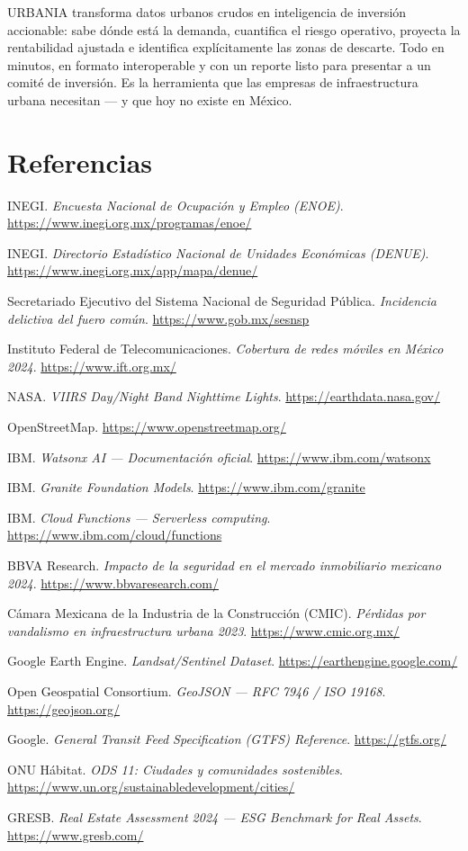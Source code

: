 \documentclass[12pt,a4paper]{article}
\begin{document}
URBANIA transforma datos urbanos crudos en inteligencia de inversión accionable: sabe dónde está la demanda, cuantifica el riesgo operativo, proyecta la rentabilidad ajustada e identifica explícitamente las zonas de descarte. Todo en minutos, en formato interoperable y con un reporte listo para presentar a un comité de inversión. Es la herramienta que las empresas de infraestructura urbana necesitan — y que hoy no existe en México.


\newpage
\section{Referencias}

\begin{enumerate}[label={[\arabic*]}, leftmargin=1.5cm]
  \item INEGI. \textit{Encuesta Nacional de Ocupación y Empleo (ENOE)}. \url{https://www.inegi.org.mx/programas/enoe/}
  \item INEGI. \textit{Directorio Estadístico Nacional de Unidades Económicas (DENUE)}. \url{https://www.inegi.org.mx/app/mapa/denue/}
  \item Secretariado Ejecutivo del Sistema Nacional de Seguridad Pública. \textit{Incidencia delictiva del fuero común}. \url{https://www.gob.mx/sesnsp}
  \item Instituto Federal de Telecomunicaciones. \textit{Cobertura de redes móviles en México 2024}. \url{https://www.ift.org.mx/}
  \item NASA. \textit{VIIRS Day/Night Band Nighttime Lights}. \url{https://earthdata.nasa.gov/}
  \item OpenStreetMap. \url{https://www.openstreetmap.org/}
  \item IBM. \textit{Watsonx AI — Documentación oficial}. \url{https://www.ibm.com/watsonx}
  \item IBM. \textit{Granite Foundation Models}. \url{https://www.ibm.com/granite}
  \item IBM. \textit{Cloud Functions — Serverless computing}. \url{https://www.ibm.com/cloud/functions}
  \item BBVA Research. \textit{Impacto de la seguridad en el mercado inmobiliario mexicano 2024}. \url{https://www.bbvaresearch.com/}
  \item Cámara Mexicana de la Industria de la Construcción (CMIC). \textit{Pérdidas por vandalismo en infraestructura urbana 2023}. \url{https://www.cmic.org.mx/}
  \item Google Earth Engine. \textit{Landsat/Sentinel Dataset}. \url{https://earthengine.google.com/}
  \item Open Geospatial Consortium. \textit{GeoJSON — RFC 7946 / ISO 19168}. \url{https://geojson.org/}
  \item Google. \textit{General Transit Feed Specification (GTFS) Reference}. \url{https://gtfs.org/}
  \item ONU Hábitat. \textit{ODS 11: Ciudades y comunidades sostenibles}. \url{https://www.un.org/sustainabledevelopment/cities/}
  \item GRESB. \textit{Real Estate Assessment 2024 — ESG Benchmark for Real Assets}. \url{https://www.gresb.com/}
\end{enumerate}
\end{document}
